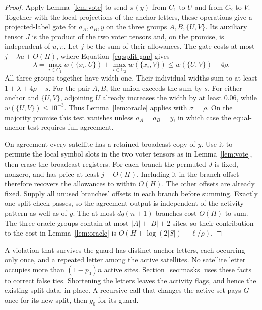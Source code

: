 \begin{proof}
Apply Lemma~\ref{lem:vote} to send \(\pi(y)\) from \(C_1\) to \(U\)
and from \(C_2\) to \(V\). Together with the local projections of
the anchor letters, these operations give a projected-label gate for
\(a_A,a_B,y\) on the three groups \(A,B,\{U,V\}\). Its auxiliary
tensor \(J\) is the product of the two voter tensors and, on the
promise, is independent of \(u,\pi\). Let \(j\) be the sum of their
allowances. The gate costs at most \(j+\lambda u+O(H)\), where
Equation~\eqref{eq:split-gap} gives
\[
 \lambda=\max_{i\in C_1} w(\{x_i,U\})
           +\max_{i\in C_2} w(\{x_i,V\})
           \le w(\{U,V\})-4\rho .
\]
All three groups together have width one. Their individual widths sum
to at least \(1+\lambda+4\rho-s\). For the pair \(A,B\), the union
exceeds the sum by \(s\). For either anchor and \(\{U,V\}\), adjoining
\(U\) already increases the width by at least \(0.06\), while
\(w(\{U,V\})\le10^{-3}\). Thus Lemma~\ref{lem:oracle} applies with
\(\sigma=\rho\). On the majority promise this test vanishes unless
\(a_A=a_B=y\), in which case the equal-anchor test requires full
agreement.

On agreement every satellite has a retained broadcast copy of \(y\).
Use it to permute the local symbol slots in the two voter tensors as
in Lemma~\ref{lem:vote}, then erase the broadcast registers. For each
branch the permuted \(J\) is fixed, nonzero, and has price at least
\(j-O(H)\). Including it in the branch offset therefore recovers the
allowances to within \(O(H)\). The other offsets are already fixed.
Supply all unused branches' offsets in each branch before summing.
Exactly one split check passes, so the agreement output is independent
of the activity pattern as well as of \(y\). The at most \(dq(n+1)\)
branches cost \(O(H)\) to sum. The three oracle groups contain at most
\(|A|+|B|+2\) sites, so their contribution to the cost in
Lemma~\ref{lem:oracle} is \(O(H+\log(2|S|)+\ell/\rho)\).
\end{proof}

A violation that survives the guard has distinct anchor letters, each
occurring only once, and a repeated letter among the active satellites.
No satellite letter occupies more than \((1-p_0)n\) active sites.
Section~\ref{sec:masks} uses these facts to correct false ties. Shortening
the letters leaves the activity flags, and hence the existing split data,
in place. A recursive call that changes the active set pays \(G\) once
for its new split, then \(g_0\) for its guard.

